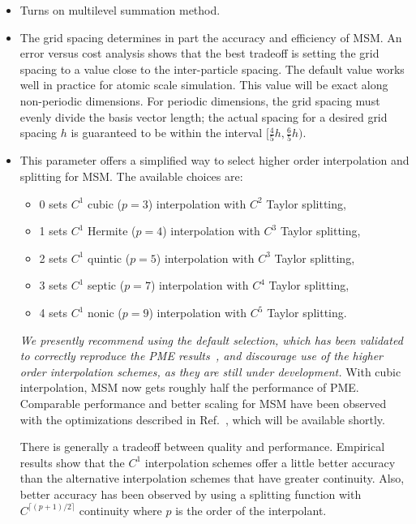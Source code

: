 \begin{itemize}

\item
{}
{Turns on multilevel summation method.}

\item
{}
{The grid spacing determines in part the accuracy and efficiency of MSM. 
An error versus cost analysis shows that the best tradeoff is setting 
the grid spacing to a value close to the inter-particle spacing. 
The default value works well in practice for atomic scale simulation.
This value will be exact along non-periodic dimensions. 
For periodic dimensions, the grid spacing must evenly divide the 
basis vector length; the actual spacing for a desired grid spacing $h$ 
is guaranteed to be within the interval
$\bigl[ \frac{4}{5} h, \frac{6}{5} h \bigr)$.}

\item
{}
{This parameter offers a simplified way to select higher order
interpolation and splitting for MSM.  The available choices are: 
\begin{itemize}
\item 0 sets $C^1$ cubic ($p=3$) interpolation with $C^2$ Taylor splitting,
\item 1 sets $C^1$ Hermite ($p=4$) interpolation with $C^3$ Taylor splitting,
\item 2 sets $C^1$ quintic ($p=5$) interpolation with $C^3$ Taylor splitting,
\item 3 sets $C^1$ septic ($p=7$) interpolation with $C^4$ Taylor splitting,
\item 4 sets $C^1$ nonic ($p=9$) interpolation with $C^5$ Taylor splitting.
\end{itemize}
\emph{We presently recommend using the default selection, 
which has been validated to correctly reproduce
the PME results~\cite{HARD2015}, 
and discourage use of the higher order interpolation schemes, 
as they are still under development.}
With cubic interpolation, MSM now gets roughly half the performance of PME. 
Comparable performance and better scaling for MSM 
have been observed with the optimizations described
in Ref.~\cite{HARD2015}, which will be available shortly. 

There is generally a tradeoff between quality and performance. 
Empirical results show that the $C^1$ interpolation schemes offer a little
better accuracy than the alternative
interpolation schemes that have greater continuity. 
Also, better accuracy has been observed by using 
a splitting function with $C^{\lceil (p+1) / 2 \rceil}$ continuity 
where $p$ is the order of the interpolant. 
}


\end{itemize}
